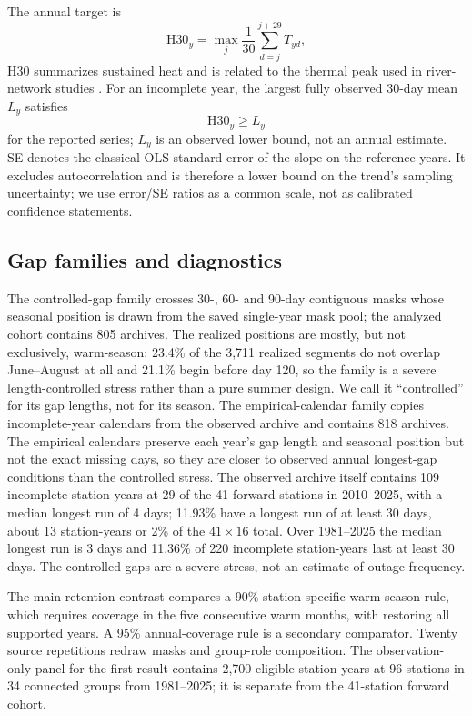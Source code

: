 The annual target is
\begin{equation}
\mathrm{H30}_y=\max_{j}\frac{1}{30}\sum_{d=j}^{j+29}T_{yd},
\label{eq:h30}
\end{equation}
$\mathrm{H30}$ summarizes sustained heat and is related to the thermal peak used in river-network studies \citep{beaufort2022}. For an incomplete year, the largest fully observed 30-day mean $L_y$ satisfies
\begin{equation}
\mathrm{H30}_y\ge L_y
\label{eq:bound}
\end{equation}
for the reported series; $L_y$ is an observed lower bound, not an annual estimate. SE denotes the classical OLS standard error of the slope on the reference years. It excludes autocorrelation and is therefore a lower bound on the trend's sampling uncertainty; we use error/SE ratios as a common scale, not as calibrated confidence statements.

\subsection{Gap families and diagnostics}

The controlled-gap family crosses 30-, 60- and 90-day contiguous masks whose seasonal position is drawn from the saved single-year mask pool; the analyzed cohort contains 805 archives. The realized positions are mostly, but not exclusively, warm-season: 23.4\% of the 3{,}711 realized segments do not overlap June--August at all and 21.1\% begin before day 120, so the family is a severe length-controlled stress rather than a pure summer design. We call it ``controlled'' for its gap lengths, not for its season. The empirical-calendar family copies incomplete-year calendars from the observed archive and contains 818 archives. The empirical calendars preserve each year's gap length and seasonal position but not the exact missing days, so they are closer to observed annual longest-gap conditions than the controlled stress. The observed archive itself contains 109 incomplete station-years at 29 of the 41 forward stations in 2010--2025, with a median longest run of 4 days; 11.93\% have a longest run of at least 30 days, about 13 station-years or 2\% of the $41\times16$ total. Over 1981--2025 the median longest run is 3 days and 11.36\% of 220 incomplete station-years last at least 30 days. The controlled gaps are a severe stress, not an estimate of outage frequency.

The main retention contrast compares a 90\% station-specific warm-season rule, which requires coverage in the five consecutive warm months, with restoring all supported years. A 95\% annual-coverage rule is a secondary comparator. Twenty source repetitions redraw masks and group-role composition. The observation-only panel for the first result contains 2,700 eligible station-years at 96 stations in 34 connected groups from 1981--2025; it is separate from the 41-station forward cohort.


